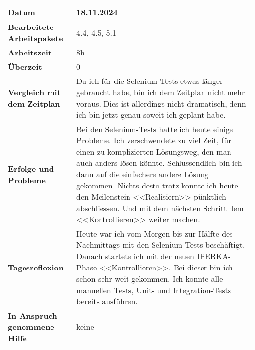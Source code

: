 \begin{longtable}{p{}|p{}}
	\hline
	\textbf{Datum}                       & 18.11.2024 \\
	\hline
	\textbf{Bearbeitete Arbeitspakete}   & 4.4, 4.5, 5.1\\
	\hline
	\textbf{Arbeitszeit}                 & 8h \\
	\hline
	\textbf{Überzeit}                    & 0 \\
	\hline
	\textbf{Vergleich mit dem Zeitplan}  & Da ich für die Selenium-Tests etwas länger gebraucht habe, bin ich dem Zeitplan nicht mehr voraus. Dies ist allerdings nicht dramatisch, denn ich bin jetzt genau soweit ich geplant habe.\\
	\hline
	\textbf{Erfolge und Probleme}        & Bei den Selenium-Tests hatte ich heute einige Probleme. Ich verschwendete zu viel Zeit, für einen zu komplizierten Lösungsweg, den man auch anders lösen könnte. Schlussendlich bin ich dann auf die einfachere andere Lösung gekommen. Nichts desto trotz konnte ich heute den Meilenstein <<Realisiern>> pünktlich abschliessen. Und mit dem nächsten Schritt dem <<Kontrollieren>> weiter machen.
	\\
	\hline
	\textbf{Tagesreflexion}              &  Heute war ich vom Morgen bis zur Hälfte des Nachmittags mit den Selenium-Tests beschäftigt. Danach startete ich mit der neuen IPERKA-Phase <<Kontrollieren>>. Bei dieser bin ich schon sehr weit gekommen. Ich konnte alle manuellen Tests, Unit- und Integration-Tests bereits ausführen.
	\\
	\hline
	\textbf{In Anspruch genommene Hilfe} & keine \\
	\hline
\end{longtable}\label{tab:arbeitsprotokoll-tag8}
\newpage

